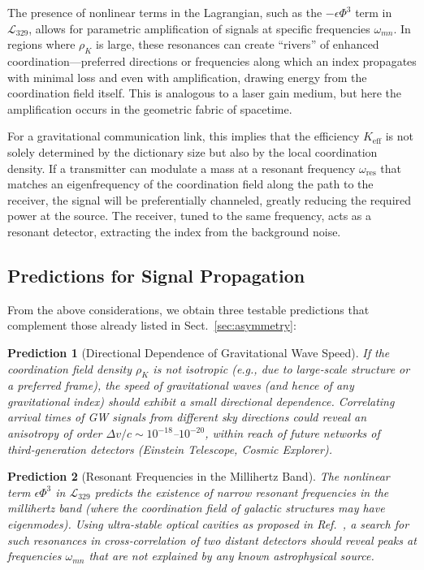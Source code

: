 \documentclass[12pt,a4paper]{article}
\newcommand{\Keff}{K_{\mathrm{eff}}}
\newtheorem{prediction}{Prediction}   %
\begin{document}
	The presence of nonlinear terms in the Lagrangian, such as the \(-\epsilon \Phi^3\) term in \(\mathcal{L}_{329}\), allows for parametric amplification of signals at specific frequencies \(\omega_{mn}\). In regions where \(\rho_K\) is large, these resonances can create ``rivers'' of enhanced coordination—preferred directions or frequencies along which an index propagates with minimal loss and even with amplification, drawing energy from the coordination field itself. This is analogous to a laser gain medium, but here the amplification occurs in the geometric fabric of spacetime.
	
	For a gravitational communication link, this implies that the efficiency \(\Keff\) is not solely determined by the dictionary size but also by the local coordination density. If a transmitter can modulate a mass at a resonant frequency \(\omega_{\mathrm{res}}\) that matches an eigenfrequency of the coordination field along the path to the receiver, the signal will be preferentially channeled, greatly reducing the required power at the source. The receiver, tuned to the same frequency, acts as a resonant detector, extracting the index from the background noise.
	
	\subsection{Predictions for Signal Propagation}
	
	From the above considerations, we obtain three testable predictions that complement those already listed in Sect.~\ref{sec:asymmetry}:
	
	\begin{prediction}[Directional Dependence of Gravitational Wave Speed]
		If the coordination field density \(\rho_K\) is not isotropic (e.g., due to large‑scale structure or a preferred frame), the speed of gravitational waves (and hence of any gravitational index) should exhibit a small directional dependence. Correlating arrival times of GW signals from different sky directions could reveal an anisotropy of order \(\Delta v/c \sim 10^{-18}\)–\(10^{-20}\), within reach of future networks of third‑generation detectors (Einstein Telescope, Cosmic Explorer).
	\end{prediction}
	
	\begin{prediction}[Resonant Frequencies in the Millihertz Band]
		The nonlinear term \(\epsilon \Phi^3\) in \(\mathcal{L}_{329}\) predicts the existence of narrow resonant frequencies in the millihertz band (where the coordination field of galactic structures may have eigenmodes). Using ultra‑stable optical cavities as proposed in Ref.~\cite{Barontini2025}, a search for such resonances in cross‑correlation of two distant detectors should reveal peaks at frequencies \(\omega_{mn}\) that are not explained by any known astrophysical source.
	\end{prediction}
	
\end{document}
